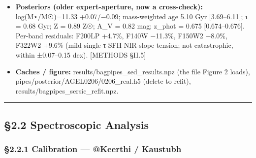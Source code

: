 \documentclass[
]{article}
\newcommand{\BreakablePath}[1]{{\ttfamily\sloppy #1}}
\begin{document}
\begin{itemize}
  biased low by \textasciitilde0.07 dex (+16\% in M⋆), within the quoted
  uncertainty. {[}METHODS §II.6{]} \textbf{NOTE (updated 2026-06-10):}
  this analytic-total refit is superseded by the per-aperture
  \textbf{single-Sérsic fill-in} under the principled color-gated
  IR-extended masks (§2.1.1b / §3.2): the headline is the empirical raw
  value \textbf{11.36 (10\%)} with a one-sided \textbf{+0.14} dex
  fill-in systematic reaching \textbf{11.47}. The 11.40 analytic-total
  sits just inside that bracket and the central is consistent with the
  validated expert hand-mask 11.33. The enhanced comparison figure
  \BreakablePath{results/\discretionary{}{}{}figures/\discretionary{}{}{}nb08\_\discretionary{}{}{}sersic\_\discretionary{}{}{}vs\_\discretionary{}{}{}aperture.\discretionary{}{}{}png}
  now overlays, for both the empirical-aperture and Sérsic-total
  choices, the best-fit Bagpipes model SED, the measured photometry, and
  the filter-convolved model photometry.
\item
  \textbf{Posteriors (older expert-aperture, now a cross-check):}
  log(M⋆/M☉)=11.33 +0.07/−0.09; mass-weighted age 5.10 Gyr
  {[}3.69--6.11{]}; τ = 0.68 Gyr; Z = 0.89 Z☉; A\_V = 0.82 mag; z\_phot
  = 0.675 {[}0.674--0.676{]}. Per-band residuals: F200LP +4.7\%, F140W
  −11.3\%, F150W2 −8.0\%, F322W2 +9.6\% (mild single-τ-SFH NIR-slope
  tension; not catastrophic, within ±0.07--0.15 dex). {[}METHODS
  §II.5{]}
\item
  \textbf{Caches / figure:}
  \BreakablePath{results/\discretionary{}{}{}bagpipes\_\discretionary{}{}{}sed\_\discretionary{}{}{}results.\discretionary{}{}{}npz}
  (the file Figure 2 loads),
  \BreakablePath{pipes/\discretionary{}{}{}posterior/\discretionary{}{}{}AGEL0206/\discretionary{}{}{}0206\_\discretionary{}{}{}real.\discretionary{}{}{}h5}
  (delete to refit),
  \BreakablePath{results/\discretionary{}{}{}bagpipes\_\discretionary{}{}{}sersic\_\discretionary{}{}{}refit.\discretionary{}{}{}npz}.
\end{itemize}

\begin{center}\rule{0.5\linewidth}{0.5pt}\end{center}

\hypertarget{spectroscopic-analysis}{%
\subsection{§2.2 Spectroscopic Analysis}\label{spectroscopic-analysis}}

\hypertarget{calibration-keerthi-kaustubh}{%
\subsubsection{§2.2.1 Calibration --- @Keerthi /
Kaustubh}\label{calibration-keerthi-kaustubh}}
\end{document}

